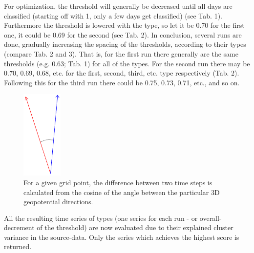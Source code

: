 \documentclass[12pt, oneside, a4paper, headsepline, plainheadsepline]{scrbook}
\begin{document}
For optimization, the threshold will generally be decreased until all days are classified (starting off with 1, only a few days get classified) (see Tab. 1). Furthermore the threshold is lowered with the type, so let it be 0.70 for the first one, it could be 0.69 for the second (see Tab. 2). In conclusion, several runs are done, gradually increasing the spacing of the thresholds, according to their types (compare Tab. 2 and 3). That is, for the first run there generally are the same thresholds (e.g. 0.63; Tab. 1) for all of the types. For the second run there may be 0.70, 0.69, 0.68, etc. for the first, second, third, etc. type respectively (Tab. 2). Following this for the third run there could be 0.75, 0.73, 0.71, etc., and so on.\\
%
\begin{figure}[h]
\centering
\includegraphics[width=2cm]{erp_ug_arrow.png}
\caption{For a given grid point, the difference between two time steps is calculated from the cosine of the angle between the particular 3D geopotential directions.}
\label{fig:erpicum02}
\end{figure}
%
All the resulting time series of types (one series for each run - or overall-decrement of the threshold) are now evaluated due to their explained cluster variance in the source-data. Only the series which achieves the highest score is returned.
\end{document}
